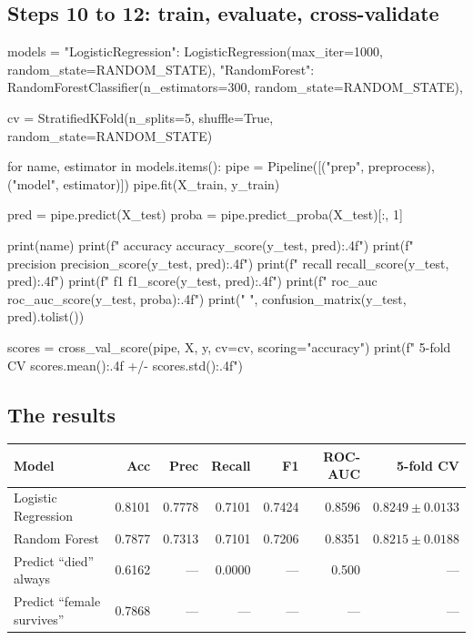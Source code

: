 \documentclass[11pt,a4paper]{article}
\begin{document}

\subsection{Steps 10 to 12: train, evaluate, cross-validate}

\begin{py}
models = {
    "LogisticRegression": LogisticRegression(max_iter=1000,
                                             random_state=RANDOM_STATE),
    "RandomForest": RandomForestClassifier(n_estimators=300,
                                           random_state=RANDOM_STATE),
}

cv = StratifiedKFold(n_splits=5, shuffle=True, random_state=RANDOM_STATE)

for name, estimator in models.items():
    pipe = Pipeline([("prep", preprocess), ("model", estimator)])
    pipe.fit(X_train, y_train)

    pred  = pipe.predict(X_test)
    proba = pipe.predict_proba(X_test)[:, 1]

    print(name)
    print(f"  accuracy  {accuracy_score(y_test, pred):.4f}")
    print(f"  precision {precision_score(y_test, pred):.4f}")
    print(f"  recall    {recall_score(y_test, pred):.4f}")
    print(f"  f1        {f1_score(y_test, pred):.4f}")
    print(f"  roc_auc   {roc_auc_score(y_test, proba):.4f}")
    print(" ", confusion_matrix(y_test, pred).tolist())

    scores = cross_val_score(pipe, X, y, cv=cv, scoring="accuracy")
    print(f"  5-fold CV {scores.mean():.4f} +/- {scores.std():.4f}")
\end{py}

\subsection{The results}

\begin{tabularx}{\textwidth}{@{}l r r r r r r@{}}
\toprule
\rowcolor{tablehead} \textbf{Model} & \textbf{Acc} & \textbf{Prec} & \textbf{Recall} & \textbf{F1} & \textbf{ROC-AUC} & \textbf{5-fold CV} \\
\midrule
Logistic Regression & 0.8101 & 0.7778 & 0.7101 & 0.7424 & 0.8596 & $0.8249 \pm 0.0133$ \\
Random Forest & 0.7877 & 0.7313 & 0.7101 & 0.7206 & 0.8351 & $0.8215 \pm 0.0188$ \\
\midrule
Predict ``died'' always & 0.6162 & --- & 0.0000 & --- & 0.500 & --- \\
Predict ``female survives'' & 0.7868 & --- & --- & --- & --- & --- \\
\bottomrule
\end{tabularx}
\end{document}
